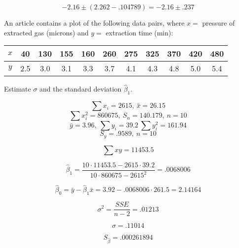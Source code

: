 \begin{questions}
\begin{parts}
\begin{solution}
            $$-2.16 \pm (2.262 - .104789) = -2.16 \pm .237$$

        \end{solution}

    \end{parts}

    \question[5] An article contains a plot of the following data
    pairs, where $x = $ pressure of extracted gas (microns) and $y = $
    extraction time (min):

    \begin{tabular}{c|cccccccccc}
        $x$ & 40  & 130 & 155 & 160 & 260 & 275 & 325 & 370 & 420 &
        480 \\
        \hline
        $y$ & 2.5 & 3.0 & 3.1 & 3.3 & 3.7 & 4.1 & 4.3 & 4.8 & 5.0 &
        5.4 \\
    \end{tabular}

    Estimate $\sigma$ and the standard deviation $\hat{\beta}_1$.

    \begin{solution}

        $$\sum x_i = 2615,\ \bar{x} = 26.15$$
        $$\sum x_i^2 = 860675,\ S_\alpha = 140.179,\ n = 10$$
        $$\bar{y} = 3.96,\ \sum y_i = 39.2\ \sum y_i^2 = 161.94$$
        $$S_y = .9589,\ n = 10$$

        $$\sum xy = 11453.5$$

        $$\hat{\beta}_1 = \frac{10 \cdot 11453.5 - 2615 \cdot
        39.2}{10 \cdot 860675 - 2615^2} = .0068006$$

        $$\hat{\beta}_0 = \bar{y} - \hat{\beta}_1 \bar{x} = 3.92 -
        .0068006 \cdot 261.5 = 2.14164$$

        $$\sigma^2 = \frac{SSE}{n - 2} = .01213$$

        $$\sigma = .11014$$

        $$S_{\hat{\beta}} = .000261894$$        

    \end{solution}

\end{questions}



